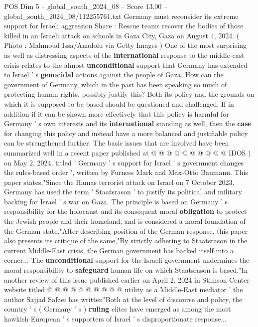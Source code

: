 \begin{textsample}{POS Dim 5 – global\_south\_2024\_08 – Score 13.00 – global\_south\_2024\_08/112255761.txt}  \label{ex:f5_pos_283}
Germany must reconsider its extreme support for Israeli aggression Share : Rescue teams recover the bodies of those killed in an Israeli attack on schools in Gaza City, Gaza on August 4, 2024. ( Photo : Mahmoud Issa/Anadolu via Getty Images ) One of the most surprising as well as distressing aspects of the \textbf{international} response to the middle-east crisis relates to the almost \textbf{unconditional} support that Germany has extended to Israel ' s \textbf{genocidal} actions against the people of Gaza.
How can the government of Germany, which in the past has been speaking so much of protecting human rights, possibly justify this?
Both its policy and the grounds on which it is supposed to be based should be questioned and challenged.
If in addition if it can be shown more effectively that this policy is harmful for Germany ' s own interests and its \textbf{international} standing as well, then the \textbf{case} for changing this policy and instead have a more balanced and justifiable policy can be strengthened further.
The basic issues that are involved have been summarized well in a recent paper published at @ @ @ @ @ @ @ @ @ @ IDOS ) on May 2, 2024, titled ' Germany ' s support for Israel ' s government changes the rules-based order ', written by Furness Mark and Max-Otto Baumann.
This paper states,"Since the Hamas terrorist attack on Israel on 7 October 2023, Germany has used the term ' Staatsrason ' to justify its political and military backing for Israel ' s war on Gaza.
The principle is based on Germany ' s responsibility for the holocaust and its consequent moral \textbf{obligation} to protect the Jewish people and their homeland, and is considered a moral foundation of the German state."After describing position of the German response, this paper also presents its critique of the same,"By strictly adhering to Staatsrason in the current Middle-East crisis, the German government has backed itself into a corner...
The \textbf{unconditional} support for the Israeli government undermines the moral responsibility to \textbf{safeguard} human life on which Staatsrason is based."In another review of this issue published earlier on April 2, 2024 in Stimson Center website titled @ @ @ @ @ @ @ @ @ @ utility as a Middle-East mediator ' the author Sajjad Safaei has written"Both at the level of discourse and policy, the country ' s ( Germany ' s ) \textbf{ruling} elites have emerged as among the most hawkish European ' s supporters of Israel ' s disproportionate response...

\end{textsample}
